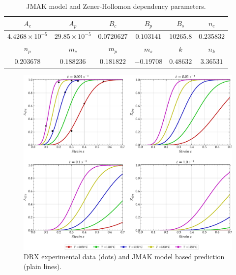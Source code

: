 \documentclass[metals,article,submit,pdftex,moreauthors]{Definitions/mdpi}
\begin{document}
\begin{table}[h]
\centering
\caption{JMAK model and Zener-Hollomon dependency parameters.}\vspace{-1mm}
\begin{tabular}{cccccc}
\toprule
$A_c$ & $A_p$& $B_c$& $B_p$& $B_s$& $n_c$ \\
\hline
$4.4268\times10^{-5}$& $29.85\times10^{-5}$& $0.0720627$&$0.103141	$&$10265.8	$&$0.235832	$\\
\toprule
$n_p$ & $m_c$& $m_p$& $m_s$& $k$& $n_k$ \\
\hline
$0.203678	$& $0.188236$&$0.181822$&$-0.19708$&$0.48632$&$3.36531$\\
\bottomrule
\end{tabular}
\label{tab:allparams}
\end{table}
\begin{figure}[H]
	\centering
	\includegraphics[width=0.99\columnwidth]{Figures/nDRX1}
	\caption{DRX experimental data (dots) and JMAK model based prediction (plain lines).}
	\label{fig:nDRX}
\end{figure}
\end{document}
